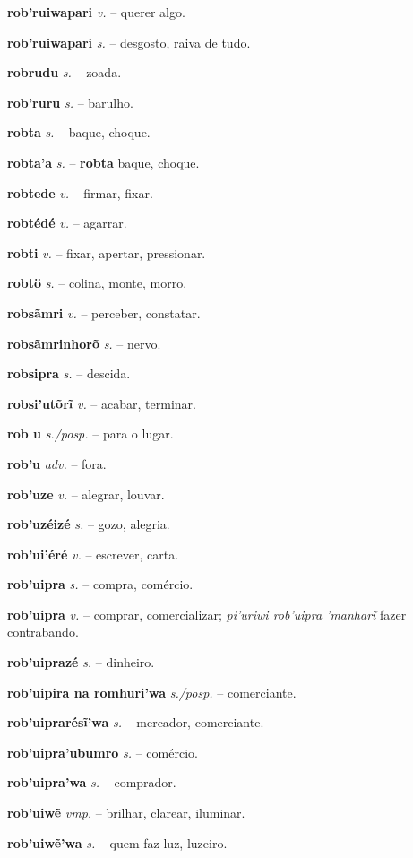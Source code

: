 \textbf{rob'ruiwapari} \textit{v.} -- querer algo.

\textbf{rob'ruiwapari} \textit{s.} -- desgosto, raiva de tudo.

\textbf{robrudu} \textit{s.} -- zoada.

\textbf{rob'ruru} \textit{s.} -- barulho.

\textbf{robta} \textit{s.} -- baque, choque.

\textbf{robta'a} \textit{s.} -- \textbf{robta} baque, choque.

\textbf{robtede} \textit{v.} -- firmar, fixar.

\textbf{robtédé} \textit{v.} -- agarrar.

\textbf{robti} \textit{v.} -- fixar, apertar, pressionar.

\textbf{robtö} \textit{s.} -- colina, monte, morro.

\textbf{robsãmri} \textit{v.} -- perceber, constatar.

\textbf{robsãmrinhorõ} \textit{s.} -- nervo.

\textbf{robsipra} \textit{s.} -- descida.

\textbf{robsi'utõrĩ} \textit{v.} -- acabar, terminar.

\textbf{rob u} \textit{s./posp.} -- para o lugar.

\textbf{rob'u} \textit{adv.} -- fora.

\textbf{rob'uze} \textit{v.} -- alegrar, louvar.

\textbf{rob'uzéizé} \textit{s.} -- gozo, alegria.

\textbf{rob'ui'éré} \textit{v.} -- escrever, carta.

\textbf{rob'uipra} \textit{s.} -- compra, comércio.

\textbf{rob'uipra} \textit{v.} -- comprar, comercializar; \textit{pi'uriwi rob'uipra 'manharĩ} fazer contrabando.

\textbf{rob'uiprazé} \textit{s.} -- dinheiro.

\textbf{rob'uipira na romhuri'wa} \textit{s./posp.} -- comerciante.

\textbf{rob'uiprarésĩ'wa} \textit{s.} -- mercador, comerciante.

\textbf{rob'uipra'ubumro} \textit{s.} -- comércio.

\textbf{rob'uipra'wa} \textit{s.} -- comprador.

\textbf{rob'uiwẽ} \textit{vmp.} -- brilhar, clarear, iluminar.

\textbf{rob'uiwẽ'wa} \textit{s.} -- quem faz luz, luzeiro.


